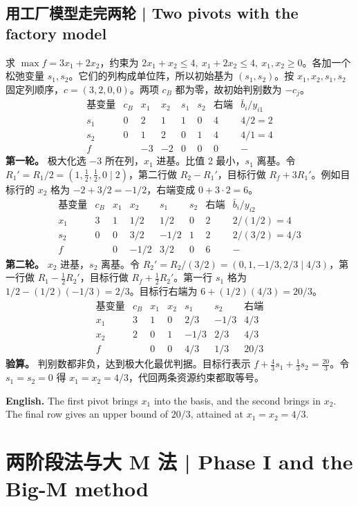 \documentclass[UTF8,11pt,a4paper]{ctexart}
\newcommand{\EN}[1]{\par\noindent \textbf{English.} #1\par}
\begin{document}
\subsection{用工厂模型走完两轮 | Two pivots with the factory model}
求 $\max f=3x_1+2x_2$，约束为 $2x_1+x_2\le4,\ x_1+2x_2\le4,\ x_1,x_2\ge0$。各加一个松弛变量 $s_1,s_2$。它们的列构成单位阵，所以初始基为 $(s_1,s_2)$。按 $x_1,x_2,s_1,s_2$ 固定列顺序，$c=(3,2,0,0)$。两项 $c_B$ 都为零，故初始判别数为 $-c_j$。
\[
\begin{array}{c|c|rrrr|r|c}
\text{基变量}&c_B&x_1&x_2&s_1&s_2&\text{右端}&\bar b_i/y_{i1}\\\hline
s_1&0&\boxed{2}&1&1&0&4&4/2=2\\
s_2&0&1&2&0&1&4&4/1=4\\\hline
f&&-3&-2&0&0&0&-
\end{array}
\]
\textbf{第一轮。} 极大化选 $-3$ 所在列，$x_1$ 进基。比值 2 最小，$s_1$ 离基。令 $R_1'=R_1/2=(1,\tfrac12,\tfrac12,0\mid 2)$，第二行做 $R_2-R_1'$，目标行做 $R_f+3R_1'$。例如目标行的 $x_2$ 格为 $-2+3/2=-1/2$，右端变成 $0+3\cdot 2=6$。
\[
\begin{array}{c|c|rrrr|r|c}
\text{基变量}&c_B&x_1&x_2&s_1&s_2&\text{右端}&\bar b_i/y_{i2}\\\hline
x_1&3&1&1/2&1/2&0&2&2/(1/2)=4\\
s_2&0&0&\boxed{3/2}&-1/2&1&2&2/(3/2)=4/3\\\hline
f&&0&-1/2&3/2&0&6&-
\end{array}
\]
\textbf{第二轮。} $x_2$ 进基，$s_2$ 离基。令 $R_2'=R_2/(3/2)=(0,1,-1/3,2/3\mid4/3)$，第一行做 $R_1-\tfrac12 R_2'$，目标行做 $R_f+\tfrac12 R_2'$。第一行 $s_1$ 格为 $1/2-(1/2)(-1/3)=2/3$。目标行右端为 $6+(1/2)(4/3)=20/3$。
\[
\begin{array}{c|c|rrrr|r}
\text{基变量}&c_B&x_1&x_2&s_1&s_2&\text{右端}\\\hline
x_1&3&1&0&2/3&-1/3&4/3\\
x_2&2&0&1&-1/3&2/3&4/3\\\hline
f&&0&0&4/3&1/3&20/3
\end{array}
\]
\textbf{验算。} 判别数都非负，达到极大化最优判据。目标行表示 $f+\tfrac43s_1+\tfrac13s_2=\tfrac{20}{3}$。令 $s_1=s_2=0$ 得 $x_1=x_2=4/3$，代回两条资源约束都取等号。
\EN{The first pivot brings $x_1$ into the basis, and the second brings in $x_2$. The final row gives an upper bound of $20/3$, attained at $x_1=x_2=4/3$.}

\section{两阶段法与大 M 法 | Phase I and the Big-M method}
\end{document}

